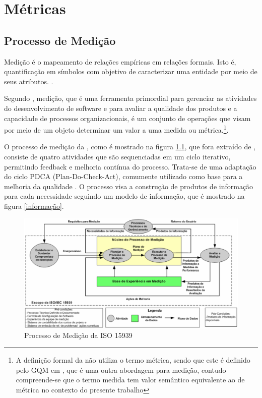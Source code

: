 \chapter{Métricas}

\section{Processo de Medição}

Medição é o mapeamento de relações empíricas em relações formais. Isto é, 
quantificação em símbolos com objetivo de caracterizar uma entidade por meio de 
seus atributos. \cite{Fenton98}.
	
Segundo , medição, que é uma ferramenta primordial para 
gerenciar as atividades do desenvolvimento de software e para avaliar a 
qualidade dos produtos e a capacidade de processos organizacionais, é um 
conjunto de operações que visam por meio de um objeto determinar um valor a uma 
medida ou 
métrica.\footnote{A definição formal da  não utiliza o 
termo métrica, sendo que este é definido pelo GQM em , 
que é uma outra abordagem para medição, contudo compreende-se que o termo medida 
tem valor semântico equivalente ao de métrica no contexto do presente trabalho}. 
	
	
O processo de medição da , como é mostrado na figura 
\ref{processo}, que fora extraído de , consiste de quatro 
atividades que são sequenciadas em um ciclo iterativo, permitindo feedback e 
melhoria contínua do processo. Trata-se de uma adaptação do ciclo 
PDCA (Plan-Do-Check-Act), comumente utilizado como base para a melhoria da 
qualidade \cite{Barcellos2010}.  O processo visa a construção de produtos de 
informação para cada necessidade seguindo um modelo de informação, que é 
mostrado na figura \ref{informação}.
		
\begin{figure}[h]
\centering	
	\includegraphics[keepaspectratio=true,scale=0.45]{figuras/processo15939.eps}
	\caption{Processo de Medição da ISO 15939}
	\label{processo}
\end{figure}
		

